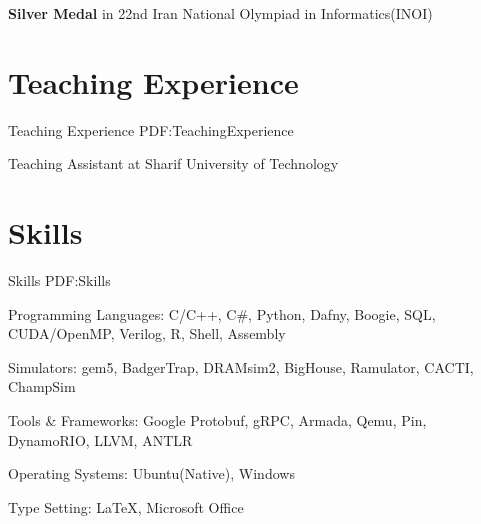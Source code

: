 \documentclass[a4paper,9pt,oneside]{article}
\begin{document}
\begin{body}
\BulletItem
\textbf{Silver Medal} in 22nd Iran National Olympiad in Informatics(INOI)
\hfill
{}



\section
{Teaching Experience}
{Teaching Experience}
{PDF:TeachingExperience}




\BulletItem Teaching Assistant at Sharif University of Technology










\section
{Skills}
{Skills}
{PDF:Skills}

\BulletItem
Programming Languages:
C/C++,
C\#,
Python,
Dafny,
Boogie,
SQL,
CUDA/OpenMP,
Verilog,
R,
Shell,
Assembly

\BulletItem
Simulators:
gem5,
BadgerTrap,
DRAMsim2,
BigHouse,
Ramulator,
CACTI,
ChampSim

\BulletItem
Tools \& Frameworks:
Google Protobuf,
gRPC,
Armada,
Qemu,
Pin,
DynamoRIO,
LLVM,
ANTLR

\BulletItem
Operating Systems:
Ubuntu(Native),
Windows

\BulletItem
Type Setting:
{\LaTeX},
Microsoft Office















\end{body}

\end{document}
